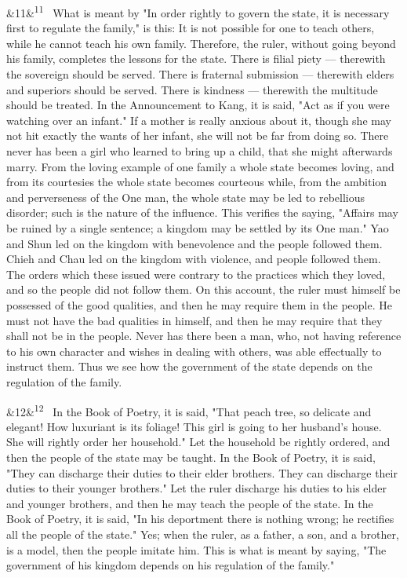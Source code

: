 \documentclass[12pt]{article}
\newcommand{\para}[1][]{\par\noindent\ifx&#1&\else\textsuperscript{\footnotesize #1}~\fi}
\begin{document}
\para[11] What is meant by "In order rightly to govern the state, it is necessary first to regulate the family," is this: It is not possible for one to teach others, while he cannot teach his own family. Therefore, the ruler, without going beyond his family, completes the lessons for the state. There is filial piety --- therewith the sovereign should be served. There is fraternal submission --- therewith elders and superiors should be served. There is kindness --- therewith the multitude should be treated. In the Announcement to Kang, it is said, "Act as if you were watching over an infant." If a mother is really anxious about it, though she may not hit exactly the wants of her infant, she will not be far from doing so. There never has been a girl who learned to bring up a child, that she might afterwards marry. From the loving example of one family a whole state becomes loving, and from its courtesies the whole state becomes courteous while, from the ambition and perverseness of the One man, the whole state may be led to rebellious disorder; such is the nature of the influence. This verifies the saying, "Affairs may be ruined by a single sentence; a kingdom may be settled by its One man." Yao and Shun led on the kingdom with benevolence and the people followed them. Chieh and Chau led on the kingdom with violence, and people followed them. The orders which these issued were contrary to the practices which they loved, and so the people did not follow them. On this account, the ruler must himself be possessed of the good qualities, and then he may require them in the people. He must not have the bad qualities in himself, and then he may require that they shall not be in the people. Never has there been a man, who, not having reference to his own character and wishes in dealing with others, was able effectually to instruct them. Thus we see how the government of the state depends on the regulation of the family.

\para[12] In the Book of Poetry, it is said, "That peach tree, so delicate and elegant! How luxuriant is its foliage! This girl is going to her husband's house. She will rightly order her household." Let the household be rightly ordered, and then the people of the state may be taught. In the Book of Poetry, it is said, "They can discharge their duties to their elder brothers. They can discharge their duties to their younger brothers." Let the ruler discharge his duties to his elder and younger brothers, and then he may teach the people of the state. In the Book of Poetry, it is said, "In his deportment there is nothing wrong; he rectifies all the people of the state." Yes; when the ruler, as a father, a son, and a brother, is a model, then the people imitate him. This is what is meant by saying, "The government of his kingdom depends on his regulation of the family."
\end{document}
